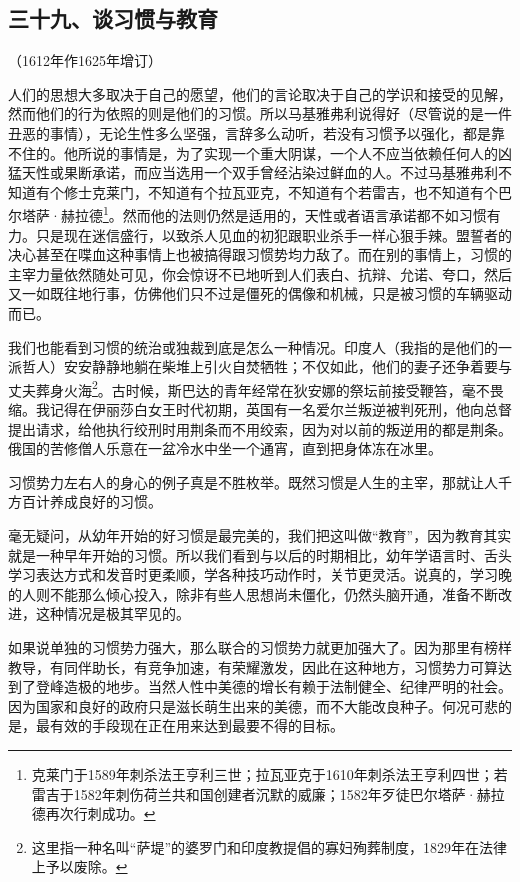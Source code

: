 \subsection*{三十九、谈习惯与教育}
\begin{center}
    （1612年作1625年增订）
\end{center}

\par 人们的思想大多取决于自己的愿望，他们的言论取决于自己的学识和接受的见解，然而他们的行为依照的则是他们的习惯。所以马基雅弗利说得好（尽管说的是一件丑恶的事情），无论生性多么坚强，言辞多么动听，若没有习惯予以强化，都是靠不住的。他所说的事情是，为了实现一个重大阴谋，一个人不应当依赖任何人的凶猛天性或果断承诺，而应当选用一个双手曾经沾染过鲜血的人。不过马基雅弗利不知道有个修士克莱门，不知道有个拉瓦亚克，不知道有个若雷吉，也不知道有个巴尔塔萨·赫拉德\footnote{克莱门于1589年刺杀法王亨利三世；拉瓦亚克于1610年刺杀法王亨利四世；若雷吉于1582年刺伤荷兰共和国创建者沉默的威廉；1582年歹徒巴尔塔萨·赫拉德再次行刺成功。}。然而他的法则仍然是适用的，天性或者语言承诺都不如习惯有力。只是现在迷信盛行，以致杀人见血的初犯跟职业杀手一样心狠手辣。盟誓者的决心甚至在喋血这种事情上也被搞得跟习惯势均力敌了。而在别的事情上，习惯的主宰力量依然随处可见，你会惊讶不已地听到人们表白、抗辩、允诺、夸口，然后又一如既往地行事，仿佛他们只不过是僵死的偶像和机械，只是被习惯的车辆驱动而已。
\par 我们也能看到习惯的统治或独裁到底是怎么一种情况。印度人（我指的是他们的一派哲人）安安静静地躺在柴堆上引火自焚牺牲；不仅如此，他们的妻子还争着要与丈夫葬身火海\footnote{这里指一种名叫“萨堤”的婆罗门和印度教提倡的寡妇殉葬制度，1829年在法律上予以废除。}。古时候，斯巴达的青年经常在狄安娜的祭坛前接受鞭笞，毫不畏缩。我记得在伊丽莎白女王时代初期，英国有一名爱尔兰叛逆被判死刑，他向总督提出请求，给他执行绞刑时用荆条而不用绞索，因为对以前的叛逆用的都是荆条。俄国的苦修僧人乐意在一盆冷水中坐一个通宵，直到把身体冻在冰里。
\par 习惯势力左右人的身心的例子真是不胜枚举。既然习惯是人生的主宰，那就让人千方百计养成良好的习惯。
\par 毫无疑问，从幼年开始的好习惯是最完美的，我们把这叫做“教育”，因为教育其实就是一种早年开始的习惯。所以我们看到与以后的时期相比，幼年学语言时、舌头学习表达方式和发音时更柔顺，学各种技巧动作时，关节更灵活。说真的，学习晚的人则不能那么倾心投入，除非有些人思想尚未僵化，仍然头脑开通，准备不断改进，这种情况是极其罕见的。
\par 如果说单独的习惯势力强大，那么联合的习惯势力就更加强大了。因为那里有榜样教导，有同伴助长，有竞争加速，有荣耀激发，因此在这种地方，习惯势力可算达到了登峰造极的地步。当然人性中美德的增长有赖于法制健全、纪律严明的社会。因为国家和良好的政府只是滋长萌生出来的美德，而不大能改良种子。何况可悲的是，最有效的手段现在正在用来达到最要不得的目标。



